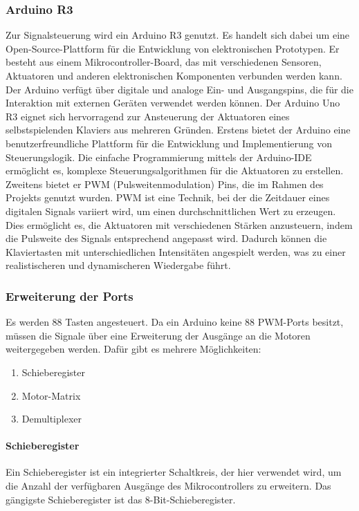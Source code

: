 \newline\subsubsection{Arduino R3}
Zur Signalsteuerung wird ein Arduino R3 genutzt.
Es handelt sich dabei um eine Open-Source-Plattform für die Entwicklung von elektronischen Prototypen. Er besteht aus
einem Mikrocontroller-Board, das mit verschiedenen Sensoren, Aktuatoren und anderen elektronischen Komponenten
verbunden werden kann. Der Arduino verfügt über digitale und analoge Ein- und Ausgangspins, die für die Interaktion mit
externen Geräten verwendet werden können. \newline
Der Arduino Uno R3 eignet sich hervorragend zur Ansteuerung der Aktuatoren eines selbstspielenden Klaviers aus
mehreren Gründen. Erstens bietet der Arduino eine benutzerfreundliche Plattform für die Entwicklung und Implementierung
von Steuerungslogik. Die einfache Programmierung mittels der Arduino-IDE ermöglicht es, komplexe Steuerungsalgorithmen
für die Aktuatoren zu erstellen. \newline
Zweitens bietet er PWM (Pulsweitenmodulation) Pins, die im Rahmen des Projekts genutzt wurden.
PWM ist eine Technik, bei der die Zeitdauer eines digitalen Signals variiert wird, um einen durchschnittlichen Wert zu
erzeugen. Dies ermöglicht es, die Aktuatoren mit verschiedenen Stärken anzusteuern, indem die Pulsweite des Signals
entsprechend angepasst wird. Dadurch können die Klaviertasten mit unterschiedlichen Intensitäten angespielt werden,
was zu einer realistischeren und dynamischeren Wiedergabe führt.

\newline \subsubsection{Erweiterung der Ports}
Es werden 88 Tasten angesteuert. Da ein Arduino keine 88 PWM-Ports besitzt, müssen die Signale über
eine Erweiterung der Ausgänge an die Motoren weitergegeben werden. Dafür gibt es mehrere Möglichkeiten:
\newline
\begin{enumerate}
	\item Schieberegister
	\item Motor-Matrix
	\item Demultiplexer
\end{enumerate}

\newline \paragraph{Schieberegister}
Ein Schieberegister ist ein integrierter Schaltkreis, der hier verwendet wird, um die Anzahl der verfügbaren Ausgänge des
Mikrocontrollers zu erweitern. Das gängigste Schieberegister ist das 8-Bit-Schieberegister. \newline

